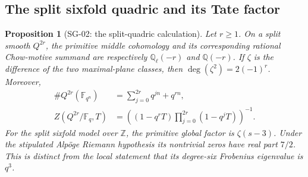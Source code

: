 \documentclass[11pt,a4paper]{article}
\newtheorem{proposition}[theorem]{Proposition}
\theoremstyle{remark}
\begin{document}
\subsection{The split sixfold quadric and its Tate factor}

\begin{proposition}[SG-02: the split-quadric calculation]
Let $r\ge1$. On a split smooth $Q^{2r}$, the primitive middle cohomology and its corresponding rational Chow-motive summand are respectively $\mathbb Q_\ell(-r)$ and $\mathbb Q(-r)$. If $\zeta$ is the difference of the two maximal-plane classes, then $\deg(\zeta^2)=2(-1)^r$. Moreover,
\begin{align*}
 \#Q^{2r}(\mathbb F_{q^n})&=\sum_{j=0}^{2r}q^{jn}+q^{rn},\\
 Z(Q^{2r}/\mathbb F_q,T)&=
 \left((1-q^rT)\prod_{j=0}^{2r}(1-q^jT)\right)^{-1}.
\end{align*}
For the split sixfold model over $\mathbb Z$, the primitive global factor is $\zeta(s-3)$. Under the stipulated Alp\"oge Riemann hypothesis its nontrivial zeros have real part $7/2$. This is distinct from the local statement that its degree-six Frobenius eigenvalue is $q^3$.
\end{proposition}
\end{document}
